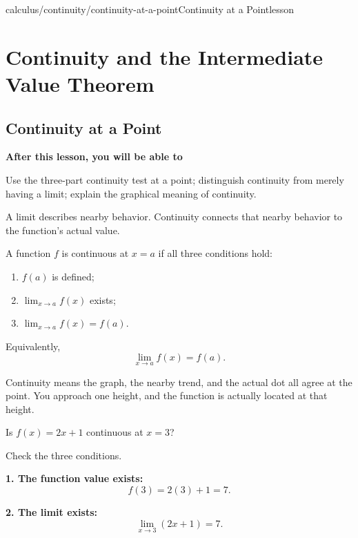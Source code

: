 \documentclass[11pt,openany]{book}
\theoremstyle{bgplain}
\newcommand{\lessonobjective}[1]{%
  \par\Needspace{4\baselineskip}\addvspace{0.6em}%
  {\bfseries\color{BGInk}After this lesson, you will be able to}\par\smallskip
  #1\par\addvspace{0.5em}%
}
\begin{document}


\begin{webpage}{calculus/continuity/continuity-at-a-point}{Continuity at a Point}{lesson}
\chapter{Continuity and the Intermediate Value Theorem}

\section{Continuity at a Point}

\lessonobjective{
Use the three-part continuity test at a point; distinguish continuity from merely having a limit; explain the graphical meaning of continuity.
}

A limit describes nearby behavior. Continuity connects that nearby behavior to the function's actual value.

\begin{bgdefinition}[title={Continuity at \(x=a\)}]
A function \(f\) is continuous at \(x=a\) if all three conditions hold:
\begin{enumerate}
  \item \(f(a)\) is defined;
  \item \(\displaystyle\lim_{x\to a}f(x)\) exists;
  \item \(\displaystyle\lim_{x\to a}f(x)=f(a)\).
\end{enumerate}
Equivalently,
\[
  \boxed{\lim_{x\to a}f(x)=f(a)}.
\]
\end{bgdefinition}

\begin{bgconcept}
Continuity means the graph, the nearby trend, and the actual dot all agree at the point. You approach one height, and the function is actually located at that height.
\end{bgconcept}

\begin{bgguided}[title={A continuous line}]
Is \(f(x)=2x+1\) continuous at \(x=3\)?

\begin{bgsolution}
Check the three conditions.

\textbf{1. The function value exists:}
\[
  f(3)=2(3)+1=7.
\]

\textbf{2. The limit exists:}
\[
  \lim_{x\to3}(2x+1)=7.
\]


\end{bgsolution}
\end{bgguided}
\end{webpage}
\end{document}
